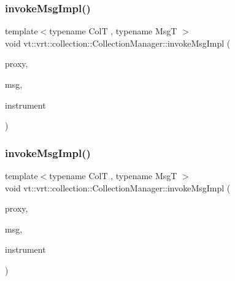 \subsubsection{\texorpdfstring{invoke\+Msg\+Impl()}{invokeMsgImpl()}\hspace{0.1cm}{\footnotesize\ttfamily [1/2]}}
{\footnotesize\ttfamily template$<$typename ColT , typename MsgT $>$ \\
void vt\+::vrt\+::collection\+::\+Collection\+Manager\+::invoke\+Msg\+Impl (\begin{DoxyParamCaption}\item[{\hyperlink{namespacevt_1_1vrt_a620a5c8c59d13e513f690c74b4af516f}{Virtual\+Elm\+Proxy\+Type}$<$ ColT $>$ const \&}]{proxy,  }\item[{\hyperlink{namespacevt_ab2b3d506ec8e8d1540aede826d84a239}{Msg\+Shared\+Ptr}$<$ MsgT $>$}]{msg,  }\item[{\mbox{[}\mbox{[}maybe\+\_\+unused\mbox{]} \mbox{]} bool}]{instrument }\end{DoxyParamCaption})}

\mbox{\label{structvt_1_1vrt_1_1collection_1_1_collection_manager_abaf663e12552109d1af87d8c9a82ce25}} 
\subsubsection{\texorpdfstring{invoke\+Msg\+Impl()}{invokeMsgImpl()}\hspace{0.1cm}{\footnotesize\ttfamily [2/2]}}
{\footnotesize\ttfamily template$<$typename ColT , typename MsgT $>$ \\
void vt\+::vrt\+::collection\+::\+Collection\+Manager\+::invoke\+Msg\+Impl (\begin{DoxyParamCaption}\item[{\hyperlink{namespacevt_1_1vrt_a620a5c8c59d13e513f690c74b4af516f}{Virtual\+Elm\+Proxy\+Type}$<$ ColT $>$ const \&}]{proxy,  }\item[{\hyperlink{namespacevt_ab2b3d506ec8e8d1540aede826d84a239}{Msg\+Shared\+Ptr}$<$ MsgT $>$}]{msg,  }\item[{bool}]{instrument }\end{DoxyParamCaption})}




